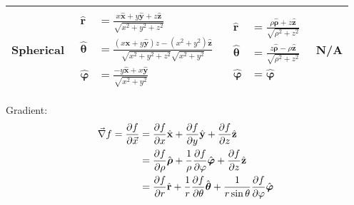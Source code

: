 \begin{center}
{\begin{tabular}{| r || l | l | l |}
					\hline\xrowht{70pt}
					Spherical & ${\displaystyle {\begin{aligned}{\hat {\mathbf {r} }}&={\frac {x{\hat {\mathbf {x} }}+y{\hat {\mathbf {y} }}+z{\hat {\mathbf {z} }}}{\sqrt {x^{2}+y^{2}+z^{2}}}}\\{\hat {\boldsymbol {\theta }}}&={\frac {\left(x{\hat {\mathbf {x} }}+y{\hat {\mathbf {y} }}\right)z-\left(x^{2}+y^{2}\right){\hat {\mathbf {z} }}}{{\sqrt {x^{2}+y^{2}+z^{2}}}{\sqrt {x^{2}+y^{2}}}}}\\{\hat {\boldsymbol {\varphi }}}&={\frac {-y{\hat {\mathbf {x} }}+x{\hat {\mathbf {y} }}}{\sqrt {x^{2}+y^{2}}}}\end{aligned}}}$ & ${\displaystyle {\begin{aligned}{\hat {\mathbf {r} }}&={\frac {\rho {\hat {\boldsymbol {\rho }}}+z{\hat {\mathbf {z} }}}{\sqrt {\rho ^{2}+z^{2}}}}\\{\hat {\boldsymbol {\theta }}}&={\frac {z{\hat {\boldsymbol {\rho }}}-\rho {\hat {\mathbf {z} }}}{\sqrt {\rho ^{2}+z^{2}}}}\\{\hat {\boldsymbol {\varphi }}}&={\hat {\boldsymbol {\varphi }}}\end{aligned}}}$ & N/A \\
					\hline
				\end{tabular}}
			\end{center}


			\noindent
			Gradient:
			\begin{equation}
				\begin{aligned}
					\vec{\nabla} f = \frac{\partial f}{\partial \vec{x}} &= \frac{\partial f}{\partial x}\hat{\mathbf x} + \frac{\partial f}{\partial y}\hat{\mathbf y}+ \frac{\partial f}{\partial z}\hat{\mathbf z} \\
					&= \frac{\partial f}{\partial \rho}\hat{\boldsymbol \rho}+ \frac{1}{\rho}\frac{\partial f}{\partial \varphi}\hat{\boldsymbol \varphi}+ \frac{\partial f}{\partial z}\hat{\mathbf z} \\
					&= \frac{\partial f}{\partial r}\hat{\mathbf r}+ \frac{1}{r}\frac{\partial f}{\partial \theta}\hat{\boldsymbol \theta}+ \frac{1}{r\sin\theta}\frac{\partial f}{\partial \varphi}\hat{\boldsymbol \varphi} \\
				\end{aligned}
			\end{equation}

